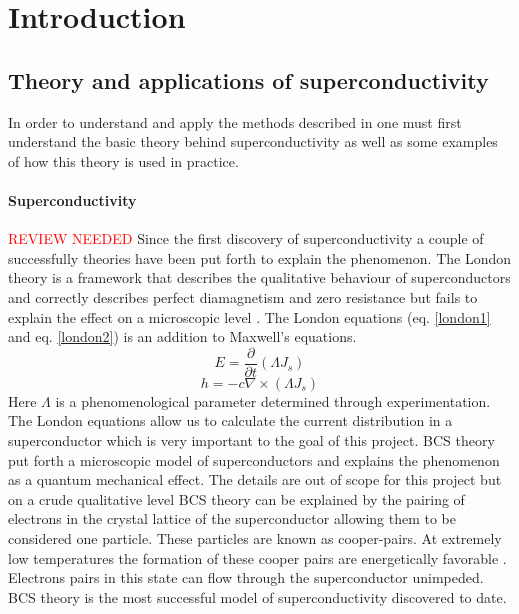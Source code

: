 \graphicspath{{introduction/fig/}}

\chapter{Introduction}
\label{chap:introduction}


\section{Theory and applications of superconductivity}
In order to understand and apply the methods described in \cite{fluxNoiseSquidsStevenAnton} one must first understand the basic theory behind superconductivity as well as some examples of how this theory is used in practice.

\subsubsection{Superconductivity}
\textcolor{red}{REVIEW NEEDED}
Since the first discovery of superconductivity a couple of successfully theories have been put forth to explain the phenomenon. The London theory is a framework that describes the qualitative behaviour of superconductors and correctly describes perfect diamagnetism and zero resistance but fails to explain the effect on a microscopic level \cite{Golubov_1998}. The London equations (eq. \ref{london1} and eq. \ref{london2}) \cite{Tinkham_2015} is an addition to Maxwell's equations.
\begin{equation}
    E = \frac{\partial}{\partial t}(\Lambda J_s)
    \label{london1}
\end{equation}
\begin{equation}
    h = -c \nabla\times (\Lambda J_s)
    \label{london2}
\end{equation}
Here $\Lambda$ is a phenomenological parameter determined through experimentation. The London equations allow us to calculate the current distribution in a superconductor which is very important to the goal of this project. BCS theory put forth a microscopic model of superconductors and explains the phenomenon as a quantum mechanical effect. The details are out of scope for this project but on a crude qualitative level BCS theory can be explained by the pairing of electrons in the crystal lattice of the superconductor allowing them to be considered one particle. These particles are known as cooper-pairs. At extremely low temperatures the formation of these cooper pairs are energetically favorable \cite{Feynman_Leighton_Sands_2013}. Electrons pairs in this state can flow through the superconductor unimpeded. BCS theory is the most successful model of superconductivity discovered to date. 
